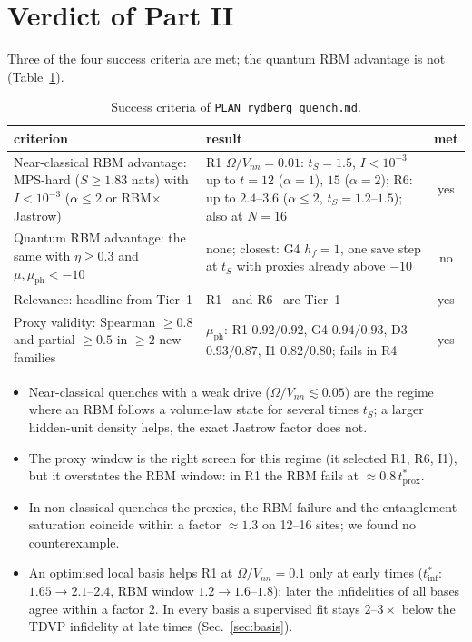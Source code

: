 \documentclass[11pt,a4paper]{article}
\newcommand{\inff}{I}
\newcommand{\tinf}{t^*_{\mathrm{inf}}}
\newcommand{\tprox}{t^*_{\mathrm{prox}}}
\begin{document}
\section{Verdict of Part II}
\label{sec:verdict2}

Three of the four success criteria are met; the quantum RBM advantage is not (Table~\ref{tab:verdict2}).

\begin{table}[h]
  \centering
  \caption{Success criteria of \texttt{PLAN\_rydberg\_quench.md}.}
  \label{tab:verdict2}
  \small
  \begin{tabular}{p{5.2cm}p{8.2cm}c}
    \toprule
    criterion & result & met\\
    \midrule
    Near-classical RBM advantage: MPS-hard ($S\ge1.83$ nats) with $\inff<10^{-3}$ ($\alpha\le2$ or RBM$\times$Jastrow)
      & R1 $\Omega/V_{nn}=0.01$: $t_S=1.5$, $\inff<10^{-3}$ up to $t=12$ ($\alpha=1$), $15$ ($\alpha=2$); R6: up to
        $2.4$--$3.6$ ($\alpha\le2$, $t_S=1.2$--$1.5$); also at $N=16$ & yes\\
    Quantum RBM advantage: the same with $\eta\ge0.3$ and $\mu,\mu_{\mathrm{ph}}<-10$
      & none; closest: G4 $h_f=1$, one save step at $t_S$ with proxies already above $-10$ & no\\
    Relevance: headline from Tier~1 & R1~\cite{Lienhard18,GuardadoSanchez18} and R6~\cite{Zeiher16,Zeiher17} are Tier~1 & yes\\
    Proxy validity: Spearman $\ge0.8$ and partial $\ge0.5$ in $\ge2$ new families
      & $\mu_{\mathrm{ph}}$: R1 $0.92/0.92$, G4 $0.94/0.93$, D3 $0.93/0.87$, I1 $0.82/0.80$; fails in R4 & yes\\
    \bottomrule
  \end{tabular}
\end{table}

\begin{itemize}
  \item Near-classical quenches with a weak drive ($\Omega/V_{nn}\lesssim0.05$) are the regime where an RBM follows a
    volume-law state for several times $t_S$; a larger hidden-unit density helps, the exact Jastrow factor does not.
  \item The proxy window is the right screen for this regime (it selected R1, R6, I1), but it overstates the RBM
    window: in R1 the RBM fails at $\approx0.8\,\tprox$.
  \item In non-classical quenches the proxies, the RBM failure and the entanglement saturation coincide within a
    factor $\approx1.3$ on 12--16 sites; we found no counterexample.
  \item An optimised local basis helps R1 at $\Omega/V_{nn}=0.1$ only at early times ($\tinf$: $1.65\to2.1$--$2.4$,
    RBM window $1.2\to1.6$--$1.8$); later the infidelities of all bases agree within a factor $2$. In every basis a
    supervised fit stays $2$--$3\times$ below the TDVP infidelity at late times (Sec.~\ref{sec:basis}).
\end{itemize}
\end{document}
